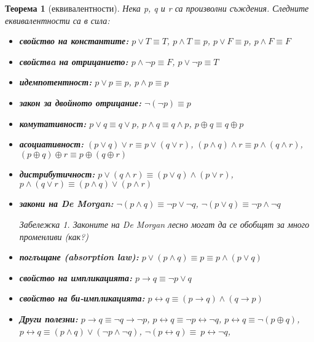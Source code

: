 \documentclass[10pt, a4paper]{article}
\newtheorem{theorem}{Теорема}[section]
\theoremstyle{definition}
\theoremstyle{remark}
\newtheorem*{remark}{Забележка}
\begin{document}
\begin{theorem}[еквивалентности]
Нека p, q и r са произволни съждения. Следните еквивалентности са в сила:
    \begin{itemize}
        \item \textbf{свойство на константите:} \(p \vee T \equiv T\), \(p \wedge T \equiv p\), \(p \vee F \equiv p\), \(p \wedge F \equiv F\)
        \item \textbf{свойствa на отрицанието:} \(p\wedge \neg p \equiv F\), \(p\vee \neg p \equiv T\)
        \item \textbf{идемпотентност:} \(p\vee p \equiv p\), \(p\wedge p \equiv p\)
        \item \textbf{закон за двойното отрицание:} \(\neg (\neg p)\equiv p\)
        \item \textbf{комутативност:} \(p\vee q\equiv q\vee p\), \(p\wedge q\equiv q\wedge p\), \(p\oplus q\equiv q\oplus p\)
        \item \textbf{асоциативност:} \((p\vee q)\vee r\equiv p\vee (q\vee r)\), \((p\wedge q)\wedge r\equiv p\wedge (q\wedge r)\), \((p\oplus q)\oplus r\equiv p\oplus (q\oplus r)\)
        \item \textbf{дистрибутичност:} \(p\vee (q\wedge r) \equiv (p\vee q) \wedge (p\vee r)\), \(p\wedge (q\vee r) \equiv (p\wedge q) \vee (p\wedge r)\) 
        \item \textbf{закони на De Morgan:} \(\neg(p\wedge q)\equiv \neg p \vee \neg q\), \(\neg(p\vee q)\equiv \neg p \wedge \neg q\)
        \begin{remark}
            Законите на De Morgan лесно могат да се обобщят за много променливи (как?)
        \end{remark}
        \item \textbf{поглъщане (absorption law):} \(p\vee(p\wedge q)\equiv p\equiv p\wedge(p\vee q)\)
        \item \textbf{свойство на импликацията:} \(p\rightarrow q\equiv \neg p \vee q\)
        \item \textbf{свойство на би-импликацията:} \(p\leftrightarrow q\equiv (p\rightarrow q)\wedge(q\rightarrow p)\)
        \item \textbf{Други полезни:}
        \(p \rightarrow q \equiv \neg q \rightarrow \neg p\), \(p \leftrightarrow q \equiv \neg p \leftrightarrow \neg q\), \(p \leftrightarrow q \equiv \neg(p\oplus q)\),\\
        \(p \leftrightarrow q \equiv (p \wedge q) \vee (\neg p \wedge \neg q)\), \(\neg(p\leftrightarrow q)\equiv\ p\leftrightarrow \neg q\),\\

\end{itemize}
\end{theorem}
\end{document}
